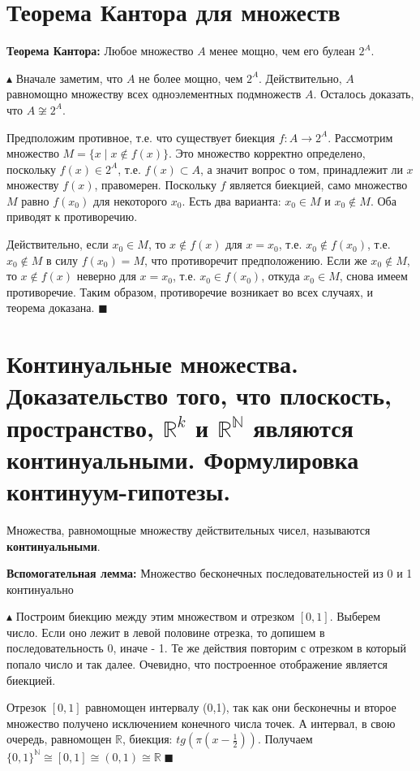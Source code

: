 \setcounter{section}{13}

\section{Теорема Кантора для множеств}
\par \textbf{Теорема Кантора:} Любое множество $A$ менее мощно, чем его булеан $2^A$.
\par $\blacktriangle$ Вначале заметим, что $A$ не более мощно, чем $2^A$. Действительно, $A$ равномощно множеству всех одноэлементных подмножеств $A$. Осталось доказать, что $A \not\cong 2^A$.
\par Предположим противное, т.е. что существует биекция $f : A \rightarrow 2^A$. Рассмотрим множество $M = \{x \; | \; x \not\in f(x)\}$. Это множество корректно определено, поскольку $f(x) \in 2^A$, т.е. $f(x) \subset A$, а значит вопрос о том, принадлежит ли $x$ множеству $f(x)$, правомерен.
Поскольку $f$ является биекцией, само множество $M$ равно $f(x_0)$ для некоторого $x_0$.
Есть два варианта: $x_0 \in M$ и $x_0 \not\in M$. Оба приводят к противоречию.
\par Действительно, если $x_0 \in M$, то $x \not\in f(x)$ для $x = x_0$, т.е. $x_0 \not\in f(x_0)$, т.е. $x_0 \not\in M$ в силу $f(x_0) = M$, что противоречит предположению. Если же $x_0 \not\in M$, то $x \not\in f(x)$
неверно для $x = x_0$, т.е. $x_0 \in f(x_0)$, откуда $x_0 \in M$, снова имеем противоречие. Таким образом, противоречие возникает во всех случаях, и теорема доказана. $\blacksquare$

\section{Континуальные множества. Доказательство того, что плоскость, пространство, $\mathbb{R}^k$ и $\mathbb{R}^{\mathbb{N}}$ являются континуальными. Формулировка \\ континуум-гипотезы.}
\par Множества, равномощные множеству действительных чисел, называются \textbf{континуальными}.
\par \textbf{Вспомогательная лемма: } Множество бесконечных последовательностей из 0 и 1 континуально
\par $\blacktriangle$ Построим биекцию между этим множеством и отрезком $[0,1]$. Выберем число. Если оно лежит в левой половине отрезка, то допишем в последовательность 0, иначе - 1. Те же действия повторим с отрезком в который попало число и так далее. Очевидно, что построенное отображение является биекцией.
\par Отрезок $[0,1]$ равномощен интервалу (0,1), так как они бесконечны и второе множество получено исключением конечного числа точек. А интервал, в свою очередь, равномощен $\mathbb{R}$, биекция: $tg(\pi (x - \frac{1}{2}))$. Получаем $\{0, 1\}^{\mathbb{N}} \cong [0,1] \cong (0,1) \cong \mathbb{R} \; \blacksquare$ 

